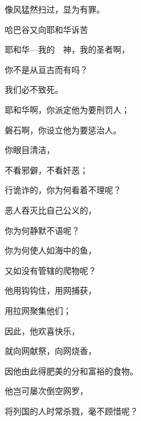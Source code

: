 {\par }{\Q 像风猛然扫过，显为有罪。
\par }{\SH 哈巴谷又向耶和华诉苦
\par }{\Q {}耶和华—我的　神，我的圣者啊，
\par }{\Q 你不是从亘古而有吗？
\par }{\Q 我们必不致死。
\par }{\Q 耶和华啊，你派定他为要刑罚人；
\par }{\Q 磐石啊，你设立他为要惩治人。
\par }{\Q {}你眼目清洁，
\par }{\Q 不看邪僻，不看奸恶；
\par }{\Q 行诡诈的，你为何看着不理呢？
\par }{\Q 恶人吞灭比自己公义的，
\par }{\Q 你为何静默不语呢？
\par }{\BB \par }{\Q {}你为何使人如海中的鱼，
\par }{\Q 又如没有管辖的爬物呢？
\par }{\Q {}他用钩钩住，用网捕获，
\par }{\Q 用拉网聚集他们；
\par }{\Q 因此，他欢喜快乐，
\par }{\Q {}就向网献祭，向网烧香，
\par }{\Q 因他由此得肥美的分和富裕的食物。
\par }{\Q {}他岂可屡次倒空网罗，
\par }{\Q 将列国的人时常杀戮，毫不顾惜呢？

}
